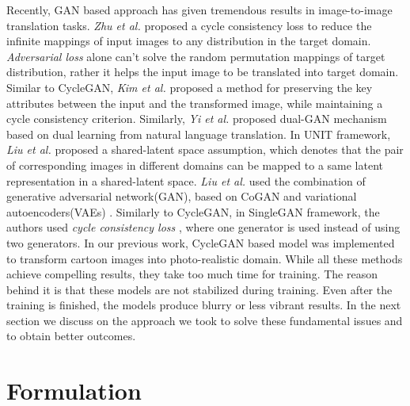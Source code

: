 \documentclass[conference]{IEEEtran}
\begin{document}
Recently, GAN\cite{DBLP:conf/nips/GoodfellowPMXWOCB14} based approach has given tremendous results in image-to-image translation tasks. \textit{Zhu et al.}\cite{DBLP:conf/iccv/ZhuPIE17} proposed a cycle consistency loss to reduce the infinite mappings of input images to any distribution in the target domain. \textit{Adversarial loss} alone can't solve the random permutation mappings of target distribution, rather it helps the input image to be translated into target domain. Similar to CycleGAN, \textit{Kim et al.} \cite{DBLP:conf/icml/KimCKLK17} proposed a method for preserving the key attributes between the input and the transformed image, while maintaining a cycle consistency criterion. Similarly,
\textit{Yi et al.} \cite{yi2017dualgan} proposed dual-GAN mechanism based on dual learning from natural language translation\cite{he2016dual}.
In UNIT\cite{DBLP:journals/corr/LiuBK17} framework, \textit{Liu et al.} proposed a shared-latent space assumption, which denotes that the pair of corresponding images in different domains can be mapped to a same latent representation in a shared-latent space. \textit{Liu et al.} used the combination of generative adversarial network(GAN), based on CoGAN\cite{liu2016coupled} and variational autoencoders(VAEs)\cite{kingma2013auto,larsen2015autoencoding,rezende2014stochastic} .
Similarly to CycleGAN\cite{DBLP:conf/iccv/ZhuPIE17}, in SingleGAN\cite{DBLP:journals/corr/abs-1810-04991} framework, the authors used \textit{cycle consistency loss} \cite{DBLP:conf/iccv/ZhuPIE17}, where one generator is used instead of using two generators\cite{DBLP:conf/iccv/ZhuPIE17}.
In our previous work, CycleGAN based model was implemented to transform cartoon images into photo-realistic domain\cite{DBLP:journals/corr/abs-1811-11796}. While all these methods achieve compelling results, they take too much time for training. The reason behind it is that these models are not stabilized during training. Even after the training is finished, the models produce blurry or less vibrant results. In the next section we discuss on the approach we took to solve these fundamental issues and to obtain better outcomes.

\section{Formulation}
\end{document}

